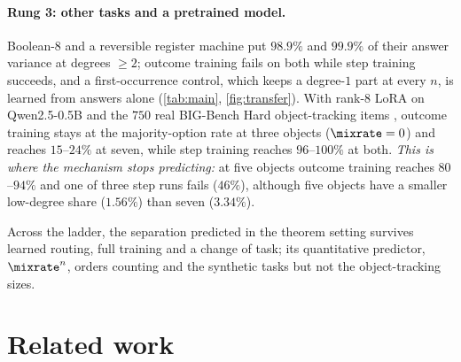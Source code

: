 \paragraph{Rung 3: other tasks and a pretrained model.} Boolean-8 and a reversible register machine put $98.9\%$ and $99.9\%$ of their
answer variance at degrees $\ge2$; outcome training fails on both while step training succeeds, and a first-occurrence control, which
keeps a degree-$1$ part at every $n$, is learned from answers alone (\cref{tab:main}, \cref{fig:transfer}). With rank-8 LoRA on
Qwen2.5-0.5B and the $750$ real BIG-Bench Hard object-tracking items \citep{suzgun2022challenging}, outcome training stays at the
majority-option rate at three objects ($\mixrate=0$) and reaches $15$--$24\%$ at seven, while step training reaches $96$--$100\%$ at both.
\emph{This is where the mechanism stops predicting:} at five objects outcome training reaches $80$--$94\%$ and one of three step runs fails
($46\%$), although five objects have a smaller low-degree share ($1.56\%$) than seven ($3.34\%$).

Across the ladder, the separation predicted in the theorem setting survives learned routing, full training and a change of task; its
quantitative predictor, $\mixrate^n$, orders counting and the synthetic tasks but not the object-tracking sizes.

\section{Related work}
\label{sec:related}

\begin{table}[t]
\caption{\textbf{Positioning.} Entries summarize what each work proves, as described in the text.}
\label{tab:related}
\centering\footnotesize
{}
\end{table}

